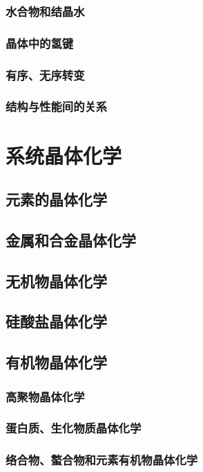 \documentclass[UTF8]{../NatureUniverse}
\begin{document}
    \subsubsection{水合物和结晶水}
    \subsubsection{晶体中的氢键}
    \subsubsection{有序、无序转变}
    \subsubsection{结构与性能间的关系}
\section{系统晶体化学}
    \subsection{元素的晶体化学}
    \subsection{金属和合金晶体化学}
    \subsection{无机物晶体化学}
    \subsection{硅酸盐晶体化学}
    \subsection{有机物晶体化学}
        \subsubsection{高聚物晶体化学}
        \subsubsection{蛋白质、生化物质晶体化学}
        \subsubsection{络合物、螯合物和元素有机物晶体化学}
\end{document}
